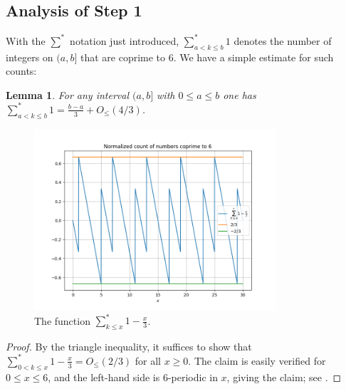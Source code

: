 \documentclass[12pt,a4paper,reqno]{amsart}
\numberwithin{equation}{section}
\theoremstyle{plain}
\newtheorem{lemma}[theorem]{Lemma}
\theoremstyle{definition}
\begin{document}
\subsection{Analysis of Step 1}

With the $\sum^*$ notation just introduced, $\sum_{a < k \leq b}^* 1$ denotes the number of integers on $(a,b]$ that are coprime to $6$.  We have a simple estimate for such counts:

\begin{lemma}\label{lit}  For any interval $(a,b]$ with $0 \leq a \leq b$ one has $\sum_{a < k \leq b}^* 1 = \frac{b-a}{3} + O_{\leq}(4/3)$.
\end{lemma}

\begin{figure}
  \centering
  \includegraphics[width=0.8\textwidth]{sawtooth.png}
  \caption{The function $\sum_{k \leq x}^* 1 - \frac{x}{3}$.}\label{fig-saw}
\end{figure}

\begin{proof}  By the triangle inequality, it suffices to show that $\sum_{0 < k \leq x}^* 1 - \frac{x}{3} = O_{\leq}(2/3)$ for all $x \geq 0$.  The claim is easily verified for $0 \leq x \leq 6$, and the left-hand side is $6$-periodic in $x$, giving the claim; see .
\end{proof}
\end{document}
